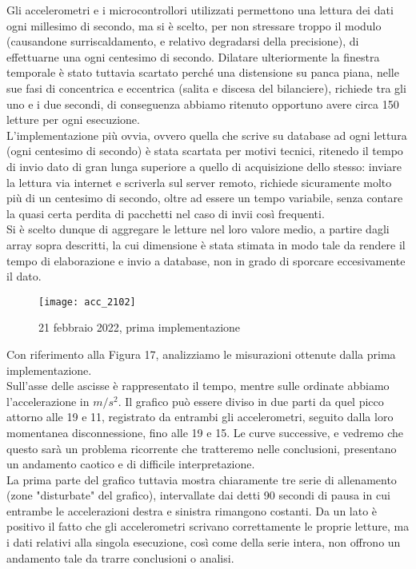 \documentclass[fleqn,10pt]{SelfArx} %
\begin{document}
Gli accelerometri e i microcontrollori utilizzati permettono una lettura dei dati ogni millesimo di secondo, ma 
si è scelto, per non stressare troppo il modulo (causandone surriscaldamento, e relativo degradarsi della 
precisione), di effettuarne una ogni centesimo di secondo. Dilatare ulteriormente la finestra temporale è stato 
tuttavia scartato perché una distensione su panca piana, nelle sue fasi di concentrica e eccentrica (salita e 
discesa del bilanciere), richiede tra gli uno e i due secondi, di conseguenza abbiamo ritenuto opportuno 
avere circa 150 letture per ogni esecuzione.\\
L'implementazione più ovvia, ovvero quella che scrive su database ad ogni lettura (ogni 
centesimo di secondo) è stata scartata per motivi tecnici, ritenedo il tempo di invio dato di gran lunga superiore 
a quello di acquisizione dello stesso: inviare la lettura via internet e scriverla sul server remoto, richiede 
sicuramente molto più di un centesimo di secondo, oltre ad essere un tempo variabile, senza contare la quasi certa 
perdita di pacchetti nel caso di invii così frequenti.\\

Si è scelto dunque di aggregare le letture nel loro valore medio, a partire dagli array sopra descritti, 
la cui dimensione è stata stimata in modo tale da rendere il tempo di elaborazione e invio a database, non in grado 
di sporcare eccesivamente il dato.

\begin{figure}[htb]\centering
	\texttt{[image: acc\_2102]}
	\caption{21 febbraio 2022, prima implementazione}
	\label{fig:accelerazione 2102}
\end{figure}

Con riferimento alla Figura 17, analizziamo le misurazioni ottenute dalla prima implementazione.\\
Sull'asse delle ascisse è rappresentato il tempo, mentre sulle ordinate abbiamo l'accelerazione in $ m/s^2 $.
Il grafico può essere diviso in due parti da quel picco attorno alle 19 e 11, registrato da entrambi gli accelerometri,
seguito dalla loro momentanea disconnessione, fino alle 19 e 15. Le curve successive, e vedremo che questo sarà un 
problema ricorrente che tratteremo nelle conclusioni, presentano un andamento caotico e di difficile interpretazione.\\
La prima parte del grafico tuttavia mostra chiaramente tre serie di allenamento (zone "disturbate" del grafico), 
intervallate dai detti 90 secondi di pausa in cui entrambe le accelerazioni destra e sinistra rimangono costanti.
Da un lato è positivo il fatto che gli accelerometri scrivano correttamente le proprie letture, ma i dati relativi alla 
singola esecuzione, così come della serie intera, non offrono un andamento tale da trarre conclusioni o analisi.
\end{document}
